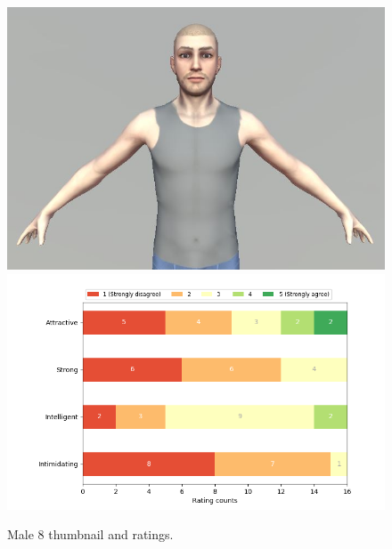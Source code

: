 \begin{figure}[H]
  \includegraphics[width=\linewidth]{Images/Males/8.JPG}
\endminipage\hfill
{}
  \includegraphics[width=\linewidth]{Survey/MRatings/avatar_m8.png}
\endminipage\hfill
\caption{Male 8 thumbnail and ratings.}
\end{figure}

